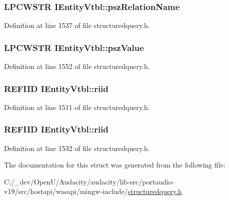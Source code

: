\subsubsection[{\texorpdfstring{psz\+Relation\+Name}{pszRelationName}}]{ {\bf L\+P\+C\+W\+S\+TR} I\+Entity\+Vtbl\+::psz\+Relation\+Name}\hypertarget{struct_i_entity_vtbl_a128c7c88f8a9b01cb371ef1ae61f9b7c}{}\label{struct_i_entity_vtbl_a128c7c88f8a9b01cb371ef1ae61f9b7c}


Definition at line 1537 of file structuredquery.\+h.

\subsubsection[{\texorpdfstring{psz\+Value}{pszValue}}]{ {\bf L\+P\+C\+W\+S\+TR} I\+Entity\+Vtbl\+::psz\+Value}\hypertarget{struct_i_entity_vtbl_a945e59a6b4797715e5d7c6682ea96562}{}\label{struct_i_entity_vtbl_a945e59a6b4797715e5d7c6682ea96562}


Definition at line 1552 of file structuredquery.\+h.

\subsubsection[{\texorpdfstring{riid}{riid}}]{ {\bf R\+E\+F\+I\+ID} I\+Entity\+Vtbl\+::riid}\hypertarget{struct_i_entity_vtbl_a4a6865cdfb04bc5ba92c56c6d360eeef}{}\label{struct_i_entity_vtbl_a4a6865cdfb04bc5ba92c56c6d360eeef}


Definition at line 1511 of file structuredquery.\+h.

\subsubsection[{\texorpdfstring{riid}{riid}}]{ {\bf R\+E\+F\+I\+ID} I\+Entity\+Vtbl\+::riid}\hypertarget{struct_i_entity_vtbl_a4a6865cdfb04bc5ba92c56c6d360eeef}{}\label{struct_i_entity_vtbl_a4a6865cdfb04bc5ba92c56c6d360eeef}


Definition at line 1532 of file structuredquery.\+h.



The documentation for this struct was generated from the following file\+:\begin{DoxyCompactItemize}
\item 
C\+:/\+\_\+dev/\+Open\+U/\+Audacity/audacity/lib-\/src/portaudio-\/v19/src/hostapi/wasapi/mingw-\/include/\hyperlink{structuredquery_8h}{structuredquery.\+h}\end{DoxyCompactItemize}
